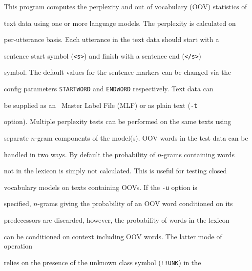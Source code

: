 %




%




%





\newpage














This program computes the perplexity and out of vocabulary (OOV) statistics of


text data using one or more language models. The perplexity is calculated on


per-utterance basis. Each utterance in the text data should start with a


sentence start symbol ({\tt <s>}) and finish with a sentence end ({\tt </s>})


symbol. The default values for the sentence markers can be changed via the


config parameters {\tt STARTWORD} and {\tt ENDWORD} respectively. Text data can


be supplied as an \HTK\ Master Label File (MLF) or as plain text ({\tt -t}


option). Multiple perplexity tests can be performed on the same texts using


separate $n$-gram components of the model(s). OOV words in the test data can be


handled in two ways. By default the probability of $n$-grams containing words


not in the lexicon is simply not calculated. This is useful for testing closed


vocabulary models on texts containing OOVs. If the {\tt -u} option is


specified, $n$-grams giving the probability of an OOV word conditioned on its


predecessors are discarded, however, the probability of words in the lexicon


can be conditioned on context including OOV words. The latter mode of operation


relies on the presence of the unknown class symbol ({\tt !!UNK}) in the



